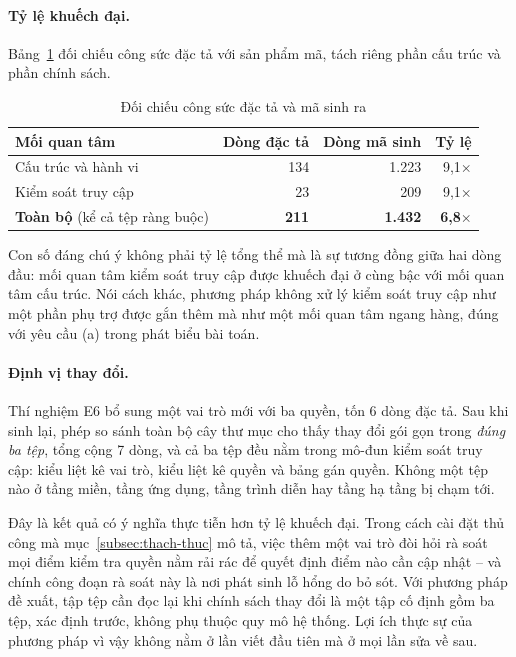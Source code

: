 \paragraph{Tỷ lệ khuếch đại.}
Bảng~\ref{tab:nang-suat} đối chiếu công sức đặc tả với sản phẩm mã, tách riêng phần cấu trúc và phần chính sách.

\begin{table}[htbp]
\centering
\caption{Đối chiếu công sức đặc tả và mã sinh ra}
\label{tab:nang-suat}
\small
\begin{tabularx}{\textwidth}{@{}Xrrr@{}}
\toprule
\textbf{Mối quan tâm} & \textbf{Dòng đặc tả} & \textbf{Dòng mã sinh} & \textbf{Tỷ lệ} \\
\midrule
Cấu trúc và hành vi & 134 & 1.223 & 9,1$\times$ \\
Kiểm soát truy cập & 23 & 209 & 9,1$\times$ \\
\midrule
\textbf{Toàn bộ} (kể cả tệp ràng buộc) & \textbf{211} & \textbf{1.432} & \textbf{6,8}$\times$ \\
\bottomrule
\end{tabularx}
\end{table}

Con số đáng chú ý không phải tỷ lệ tổng thể mà là sự tương đồng giữa hai dòng đầu: mối quan tâm kiểm soát truy cập được khuếch đại ở cùng bậc với mối quan tâm cấu trúc. Nói cách khác, phương pháp không xử lý kiểm soát truy cập như một phần phụ trợ được gắn thêm mà như một mối quan tâm ngang hàng, đúng với yêu cầu (a) trong phát biểu bài toán.

\paragraph{Định vị thay đổi.}
Thí nghiệm E6 bổ sung một vai trò mới với ba quyền, tốn 6 dòng đặc tả. Sau khi sinh lại, phép so sánh toàn bộ cây thư mục cho thấy thay đổi gói gọn trong \emph{đúng ba tệp}, tổng cộng 7 dòng, và cả ba tệp đều nằm trong mô-đun kiểm soát truy cập: kiểu liệt kê vai trò, kiểu liệt kê quyền và bảng gán quyền. Không một tệp nào ở tầng miền, tầng ứng dụng, tầng trình diễn hay tầng hạ tầng bị chạm tới.

Đây là kết quả có ý nghĩa thực tiễn hơn tỷ lệ khuếch đại. Trong cách cài đặt thủ công mà mục~\ref{subsec:thach-thuc} mô tả, việc thêm một vai trò đòi hỏi rà soát mọi điểm kiểm tra quyền nằm rải rác để quyết định điểm nào cần cập nhật -- và chính công đoạn rà soát này là nơi phát sinh lỗ hổng do bỏ sót. Với phương pháp đề xuất, tập tệp cần đọc lại khi chính sách thay đổi là một tập cố định gồm ba tệp, xác định trước, không phụ thuộc quy mô hệ thống. Lợi ích thực sự của phương pháp vì vậy không nằm ở lần viết đầu tiên mà ở mọi lần sửa về sau.

